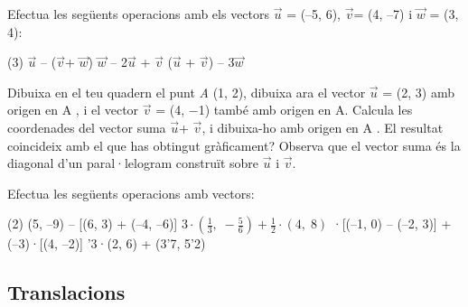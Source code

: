 \begin{mylist}


\exer[1]  Efectua les següents operacions amb els vectors $\vec u$\textit{ }= (--5, 6), $\vec v$= (4, --7) i $\vec w$ = (3, 4):

\begin{tasks}(3)
	$\vec u$ -- ($\vec v$+ $\vec w$)   
	$\vec w$ -- 2$\vec u$ + $\vec v$   
	($\vec u$ + $\vec v$) -- 3$\vec w$
\end{tasks}
\answers[cols=1]{[$(-17,15)$, $(23,-7)$, $(-11,-14)$]}

\exer  Dibuixa en el teu quadern el punt \textit{A} (1, 2), dibuixa ara el vector $\vec u$ = (2, 3) amb origen en A , i el vector $\vec v$ = (4, $-$1) també amb origen en A. Calcula les coordenades del vector suma $\vec u$+ $\vec v$, i dibuixa-ho amb origen en A . El resultat coincideix amb el que has obtingut gràficament? Observa que el vector suma és la diagonal d'un paral·lelogram construït sobre $\vec u$ i $\vec v$.


\exer  Efectua les següents operacions amb vectors:

\begin{tasks}(2)
	\task   (5, --9) -- [(6, 3) + (--4, --6)]   
	\task    $3\cdot \left(\frac{1}{3} ,\; -\frac{5}{6} \right)+\frac{1}{2} \cdot (4,\; 8)$      
	·[(--1, 0) -- (--2, 3)] + (--3)·[(4, --2)]   
	'3·(2, 6) + (3'7, 5'2)
\end{tasks}

 \answers{[$(3,-6)$, $(3,\frac{3}{2})$, $(65,-99)$, $(22.3,61)$]}

\end{mylist}

\subsection{Translacions}

